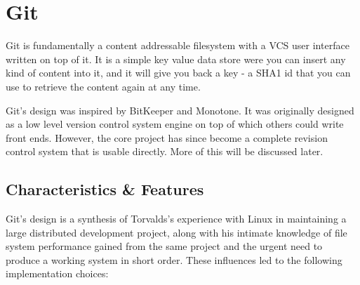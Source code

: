 \section{Git}

Git is fundamentally a content addressable filesystem with a VCS user interface
written on top of it. It is a simple key value data store were you can insert
any kind of content into it, and it will give you back a key - a SHA1 id that
you can use to retrieve the content again at any time.

Git’s design was inspired\cite{inspiration} by BitKeeper and Monotone. It was
originally designed as a low level version control system engine on top of which
others could write front ends. However, the core project has since become a
complete revision control system that is usable directly. More of this will be
discussed later.

\subsection{Characteristics \& Features \footnotemark[1]}


Git's design is a synthesis of Torvalds’s experience with Linux in maintaining a
large distributed development project, along with his intimate knowledge of file
system performance gained from the same project and the urgent need to produce a
working system in short order. These influences led to the following
implementation choices:

